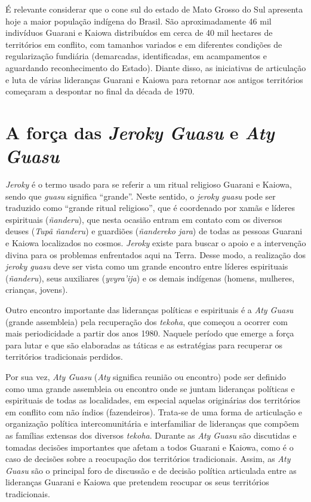 É relevante considerar que o cone sul do estado de Mato Grosso do Sul
apresenta hoje a maior população indígena do Brasil. São
aproximadamente 46 mil indivíduos Guarani e Kaiowa distribuídos em
cerca de 40 mil hectares de territórios em conflito, com tamanhos
variados e em diferentes condições de regularização fundiária
(demarcadas, identificadas, em acampamentos e aguardando reconhecimento
do Estado). Diante disso, as iniciativas de articulação e luta de
várias lideranças Guarani e Kaiowa para retornar aos antigos
territórios começaram a despontar no final da década de 1970.

\section{A força das \emph{Jeroky Guasu} e \emph{Aty Guasu}}

\emph{Jeroky} é o termo usado para se referir a um ritual religioso Guarani e
Kaiowa, sendo que \emph{guasu} significa ``grande''. Neste sentido, o \emph{jeroky
guasu} pode ser traduzido como ``grande ritual religioso'', que é
coordenado por xamãs e líderes espirituais (\emph{ñanderu}), que nesta ocasião
entram em contato com os diversos deuses (\emph{Tupã ñanderu}) e guardiões
(\emph{ñandereko jara}) de todas as pessoas Guarani e Kaiowa localizados no
cosmos. \emph{Jeroky} existe para buscar o apoio e a intervenção divina para
os problemas enfrentados aqui na Terra. Desse modo, a realização dos
\emph{jeroky guasu} deve ser vista como um grande encontro entre líderes
espirituais (\emph{ñanderu}), seus auxiliares (\emph{yvyra’ija}) e os demais
indígenas (homens, mulheres, crianças, jovens). 

Outro encontro importante das lideranças políticas e espirituais é a \emph{Aty
Guasu} (grande assembleia) pela recuperação dos \emph{tekoha}, que começou a
ocorrer com mais periodicidade a partir dos anos 1980.  Naquele período
que emerge a força para lutar e que são elaboradas as táticas e as
estratégias para recuperar os territórios tradicionais perdidos.

Por sua vez, \emph{Aty Guasu} (\emph{Aty} significa reunião ou encontro) pode ser
definido como uma grande assembleia ou encontro onde se juntam
lideranças políticas e espirituais de todas as localidades, em especial
aquelas originárias dos territórios em conflito com não índios
(fazendeiros). Trata-se de uma forma de articulação e organização
política intercomunitária e interfamiliar de lideranças que compõem as
famílias extensas dos diversos \emph{tekoha}. Durante as \emph{Aty Guasu} são
discutidas e tomadas decisões importantes que afetam a todos Guarani e
Kaiowa, como é o caso de decisões sobre a reocupação dos territórios
tradicionais. Assim, as \emph{Aty Guasu} são o principal foro de discussão e
de decisão política articulada entre as lideranças Guarani e Kaiowa que
pretendem reocupar os seus territórios tradicionais. 

